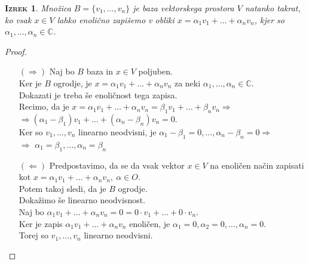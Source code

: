 \documentclass[a4paper,12pt]{article}
\newtheorem*{izrek}{\textsc{Izrek}}
\begin{document}
\begin{izrek}
Množica $B=\{v_1,\ldots,v_n\}$ je baza vektorskega prostora $V$ natanko takrat, ko vsak $x\in V$ lahko enolično zapišemo v obliki $x=\alpha_1 v_1+\ldots+\alpha_n v_n$, kjer so $\alpha_1,\ldots,\alpha_n \in \mathbb{C}$.\\
\end{izrek}

\begin{proof}~
\begin{itemize}
\item[$(\Rightarrow)$] Naj bo $B$ baza in $x\in V$ poljuben. \\

Ker je $B$ ogrodje, je $x=\alpha_1 v_1+\ldots+\alpha_n v_n$ za neki $\alpha_1,\ldots,\alpha_n \in \mathbb{C}$.\\

\noindent Dokazati je treba še enoličnost tega zapisa.\\

\noindent Recimo, da je $x=\alpha_1 v_1+\ldots + \alpha_n v_n=\beta _1 v_1+\ldots + \beta_n v_n \Rightarrow $ \\

$ \Rightarrow (\alpha_1-\beta_1)v_1+\ldots+(\alpha_n-\beta_n)v_n=0$. \\

\noindent Ker so $v_1,\ldots,v_n$ linearno neodvisni, je $\alpha_1-\beta_1=0,\ldots,\alpha_n-\beta_n=0 \Rightarrow$ \\

$\Rightarrow$ $\alpha_1=\beta_1,\ldots,\alpha_n=\beta_n$

\item[$(\Leftarrow)$] Predpostavimo, da se da vsak vektor $x\in V$ na enoličen način zapisati kot $x=\alpha_1v_1+\ldots+\alpha_nv_n,~\alpha\in O$. \\

\noindent Potem takoj sledi, da je $B$ ogrodje. \\

\noindent Dokažimo še linearno neodvisnost. \\

Naj bo $\alpha_1v_1+\ldots+\alpha_nv_n=0=0\cdot v_1+\ldots+0\cdot v_n$. \\

\noindent Ker je zapis $\alpha_1v_1+\ldots+\alpha_nv_n$ enoličen, je $\alpha_1=0,\alpha_2=0,\ldots,\alpha_n=0$. \\

\noindent Torej so $v_1,\ldots,v_n$ linearno neodvisni.\\
\end{itemize}
\end{proof}
\end{document}
